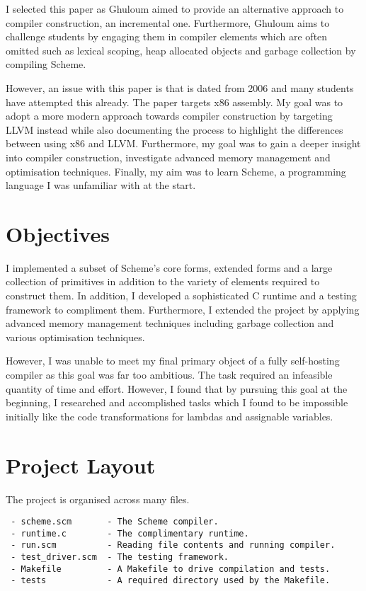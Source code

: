 \documentclass{article}
\begin{document}
I selected this paper as Ghuloum aimed to provide an alternative approach to compiler construction, an incremental one. Furthermore, Ghuloum aims to challenge students by engaging them in compiler elements which are often omitted such as lexical scoping, heap allocated objects and garbage collection by compiling Scheme.

However, an issue with this paper is that is dated from 2006 and many students have attempted this already. The paper targets x86 assembly. My goal was to adopt a more modern approach towards compiler construction by targeting LLVM instead while also documenting the process to highlight the differences between using x86 and LLVM. Furthermore, my goal was to gain a deeper insight into compiler construction, investigate advanced memory management and optimisation techniques. Finally, my aim was to learn Scheme, a programming language I was unfamiliar with at the start.

\section{Objectives}

I implemented a subset of Scheme's core forms, extended forms and a large collection of primitives in addition to the variety of elements required to construct them. In addition, I developed a sophisticated C runtime and a testing framework to compliment them. Furthermore, I extended the project by applying advanced memory management techniques including garbage collection and various optimisation techniques.

However, I was unable to meet my final primary object of a fully self-hosting compiler as this goal was far too ambitious. The task required an infeasible quantity of time and effort. However, I found that by pursuing this goal at the beginning, I researched and accomplished tasks which I found to be impossible initially like the code transformations for lambdas and assignable variables.

\section{Project Layout}

The project is organised across many files.

\begin{verbatim}
 - scheme.scm       - The Scheme compiler.
 - runtime.c        - The complimentary runtime.
 - run.scm          - Reading file contents and running compiler.
 - test_driver.scm  - The testing framework.
 - Makefile         - A Makefile to drive compilation and tests. 
 - tests            - A required directory used by the Makefile.
\end{verbatim}
\end{document}
